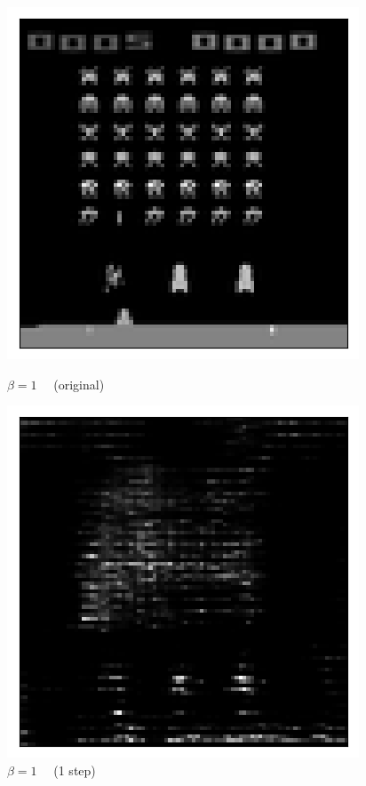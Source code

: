 \begin{figure}[h!]
\centering
\captionsetup{justification=centering}
\begin{multicols}{4}
    \includegraphics[scale=0.4]{figures/results/naive_average/beta_1_posterior_sample_original.png}
    \caption{$\beta=1\quad$ (original)}
    \includegraphics[scale=0.4]{figures/results/naive_average/beta_1_posterior_sample_0.png}
    \caption{$\beta=1\quad$ (1 step)}

\end{multicols}
\end{figure}
